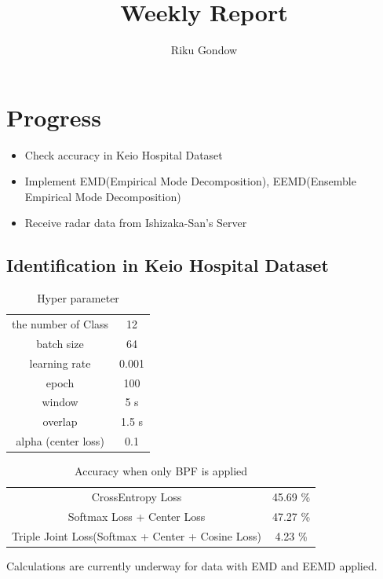\documentclass[dvipdfmx]{article}
\begin{document}
\title{Weekly Report}
\author{Riku Gondow}
\maketitle
\section{Progress}
\begin{itemize}
    \item Check accuracy in Keio Hospital Dataset
    \item Implement EMD(Empirical Mode Decomposition), EEMD(Ensemble Empirical Mode Decomposition)
    \item Receive radar data from Ishizaka-San's Server
\end{itemize}

\subsection*{Identification in Keio Hospital Dataset}

\begin{table}[H]
\caption{Hyper parameter}
\centering
\begin{tabular}{c|c}
\hline
the number of Class & 12 \\
batch size & 64 \\
learning rate & 0.001 \\
epoch & 100 \\
window & 5 s \\
overlap & 1.5 s \\
alpha (center loss) & 0.1\\
\hline
\end{tabular}
\end{table}

\begin{table}[H]
\caption{Accuracy when only BPF is applied}
\centering
\begin{tabular}{c||c}
\hline
CrossEntropy Loss & 45.69 \% \\
Softmax Loss + Center Loss & 47.27 \% \\
Triple Joint Loss(Softmax + Center + Cosine Loss) & 4.23 \% \\
\hline
\end{tabular}
\end{table}

Calculations are currently underway for data with EMD and EEMD applied.
\end{document}
